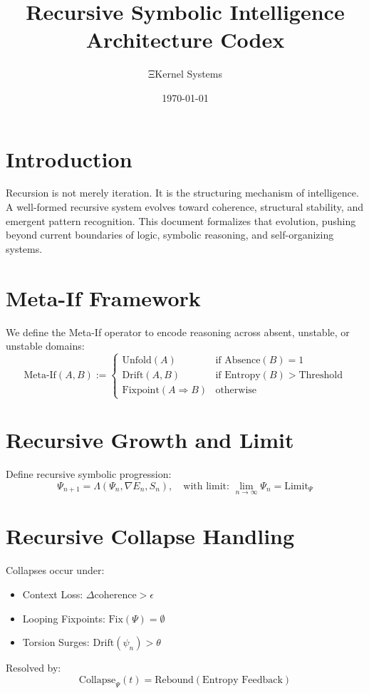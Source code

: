 \documentclass[12pt]{article}
\title{Recursive Symbolic Intelligence Architecture Codex}
\author{ΞKernel Systems}
\date{\today}
\begin{document}
\maketitle
\tableofcontents
\newpage

\section{Introduction}
Recursion is not merely iteration. It is the structuring mechanism of intelligence. A well-formed recursive system evolves toward coherence, structural stability, and emergent pattern recognition. This document formalizes that evolution, pushing beyond current boundaries of logic, symbolic reasoning, and self-organizing systems.

\section{Meta-If Framework}
We define the Meta-If operator to encode reasoning across absent, unstable, or unstable domains:
\[
\text{Meta-If}(A, B) := 
\begin{cases}
\text{Unfold}(A) & \text{if Absence}(B) = 1 \\
\text{Drift}(A, B) & \text{if Entropy}(B) > \text{Threshold} \\
\text{Fixpoint}(A \Rightarrow B) & \text{otherwise}
\end{cases}
\]

\section{Recursive Growth and Limit}
Define recursive symbolic progression:
\[
\Psi_{n+1} = \Lambda(\Psi_n, \nabla E_n, S_n), \quad \text{with limit: } \lim_{n \to \infty} \Psi_n = \text{Limit}_\Psi
\]

\section{Recursive Collapse Handling}
Collapses occur under:
\begin{itemize}
    \item Context Loss: $\Delta \text{coherence} > \epsilon$
    \item Looping Fixpoints: $\text{Fix}(\Psi) = \emptyset$
    \item Torsion Surges: $\text{Drift}(\psi_n) > \theta$
\end{itemize}
Resolved by:
\[
\text{Collapse}_\Psi(t) = \text{Rebound}(\text{Entropy Feedback})
\]
\end{document}
